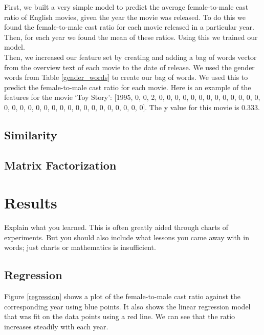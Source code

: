 \documentclass[12pt]{article}
\begin{document}
First, we built a very simple model to predict the average female-to-male cast ratio of English movies, given the year the movie was released. To do this we found the female-to-male cast ratio for each movie released in a particular year. Then, for each year we found the mean of these ratios. Using this we trained our model. \\

Then, we increased our feature set by creating and adding a bag of words vector from the overview text of each movie to the date of release. We used the gender words from Table \ref{gender_words} to create our bag of words. We used this to predict the female-to-male cast ratio for each movie. Here is an example of the features for the movie `Toy Story': [1995, 0, 0, 2, 0, 0, 0, 0, 0, 0, 0, 0, 0, 0, 0, 0, 0, 0, 0, 0, 0, 0, 0, 0, 0, 0, 0, 0, 0, 0, 0, 0, 0, 0, 0]. The y value for this movie is 0.333.

\subsection{Similarity}

\subsection{Matrix Factorization}


\section{Results}

Explain what you learned. This is often greatly aided through charts of experiments. But you should also include what lessons you came away with in words; just charts or mathematics is insufficient.

\subsection{Regression}

Figure \ref{regression} shows a plot of the female-to-male cast ratio against the corresponding year using blue points. It also shows the linear regression model that was fit on the data points using a red line. We can see that the ratio increases steadily with each year.
\end{document}
